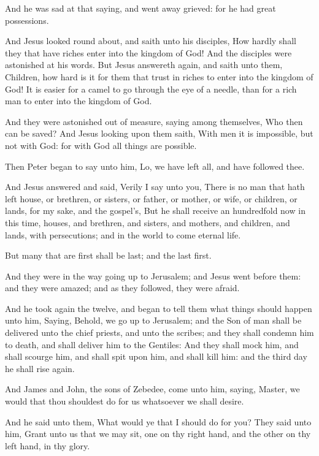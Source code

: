 \verse And he was sad at that saying, and went away grieved: for he had great possessions.

\verse And Jesus looked round about, and saith unto his disciples, How hardly shall they that have riches enter into the kingdom of God!  \verse And the disciples were astonished at his words. But Jesus answereth again, and saith unto them, Children, how hard is it for them that trust in riches to enter into the kingdom of God!  \verse It is easier for a camel to go through the eye of a needle, than for a rich man to enter into the kingdom of God.

\verse And they were astonished out of measure, saying among themselves, Who then can be saved?  \verse And Jesus looking upon them saith, With men it is impossible, but not with God: for with God all things are possible.

\verse Then Peter began to say unto him, Lo, we have left all, and have followed thee.

\verse And Jesus answered and said, Verily I say unto you, There is no man that hath left house, or brethren, or sisters, or father, or mother, or wife, or children, or lands, for my sake, and the gospel's, \verse But he shall receive an hundredfold now in this time, houses, and brethren, and sisters, and mothers, and children, and lands, with persecutions; and in the world to come eternal life.

\verse But many that are first shall be last; and the last first.

\verse And they were in the way going up to Jerusalem; and Jesus went before them: and they were amazed; and as they followed, they were afraid.

And he took again the twelve, and began to tell them what things should happen unto him, \verse Saying, Behold, we go up to Jerusalem; and the Son of man shall be delivered unto the chief priests, and unto the scribes; and they shall condemn him to death, and shall deliver him to the Gentiles: \verse And they shall mock him, and shall scourge him, and shall spit upon him, and shall kill him: and the third day he shall rise again.

\verse And James and John, the sons of Zebedee, come unto him, saying, Master, we would that thou shouldest do for us whatsoever we shall desire.

\verse And he said unto them, What would ye that I should do for you?  \verse They said unto him, Grant unto us that we may sit, one on thy right hand, and the other on thy left hand, in thy glory.

